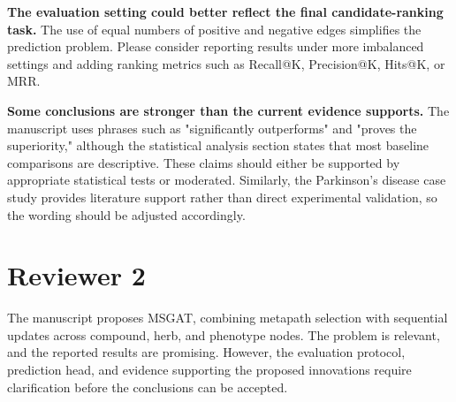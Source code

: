 \documentclass[11pt,american]{article}
\begin{document}
\begin{revresponse}

\end{revresponse}

\begin{revcomment}
\textbf{The evaluation setting could better reflect the final candidate-ranking task.} The use of equal numbers of positive and negative edges simplifies the prediction problem. Please consider reporting results under more imbalanced settings and adding ranking metrics such as Recall@K, Precision@K, Hits@K, or MRR.
\end{revcomment}

\begin{revresponse}

\end{revresponse}

\begin{revcomment}
\textbf{Some conclusions are stronger than the current evidence supports.} The manuscript uses phrases such as "significantly outperforms" and "proves the superiority," although the statistical analysis section states that most baseline comparisons are descriptive. These claims should either be supported by appropriate statistical tests or moderated. Similarly, the Parkinson's disease case study provides literature support rather than direct experimental validation, so the wording should be adjusted accordingly.
\end{revcomment}

\begin{revresponse}

\end{revresponse}

\reviewer
\section*{\normalsize{Reviewer 2}}

The manuscript proposes MSGAT, combining metapath selection with sequential updates across compound, herb, and phenotype nodes. The problem is relevant, and the reported results are promising. However, the evaluation protocol, prediction head, and evidence supporting the proposed innovations require clarification before the conclusions can be accepted.
\end{document}
